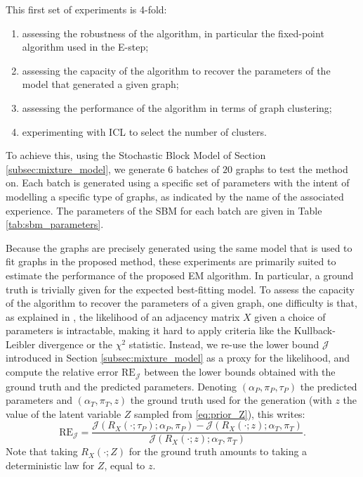 \documentclass[10pt]{article}
\newcommand{\J}{\mathcal{J}}
\begin{document}
This first set of experiments is 4-fold:
\begin{enumerate}
    \item assessing the robustness of the algorithm, in particular the fixed-point algorithm used in the E-step;
    \item assessing the capacity of the algorithm to recover the parameters of the model that generated a given graph;
    \item assessing the performance of the algorithm in terms of graph clustering;
    \item experimenting with ICL to select the number of clusters.
\end{enumerate}
To achieve this, using the Stochastic Block Model of Section \ref{subsec:mixture_model}, we generate 6 batches of $20$ graphs to test the method on. Each batch is generated using a specific set of parameters with the intent of modelling a specific type of graphs, as indicated by the name of the associated experience. The parameters of the SBM for each batch are given in Table \ref{tab:sbm_parameters}.

Because the graphs are precisely generated using the same model that is used to fit graphs in the proposed method, these experiments are primarily suited to estimate the performance of the proposed EM algorithm. In particular, a ground truth is trivially given for the expected best-fitting model. To assess the capacity of the algorithm to recover the parameters of a given graph, one difficulty is that, as explained in \cite{main_article}, the likelihood of an adjacency matrix $X$ given a choice of parameters is intractable, making it hard to apply criteria like the Kullback-Leibler divergence or the $\chi^2$ statistic. Instead, we re-use the lower bound $\mathcal{J}$ introduced in Section \ref{subsec:mixture_model} as a proxy for the likelihood, and compute the relative error $\mathrm{RE}_\J$ between the lower bounds obtained with the ground truth and the predicted parameters. Denoting $(\alpha_P, \pi_P, \tau_P)$ the predicted parameters and $(\alpha_T, \pi_T, z)$ the ground truth used for the generation (with $z$ the value of the latent variable $Z$ sampled from \eqref{eq:prior_Z}), this writes:
\begin{equation}
    \mathrm{RE}_\J = \frac{\J(R_X(\cdot; \tau_P); \alpha_P, \pi_P) - \J(R_X(\cdot; z); \alpha_T, \pi_T)}{\J(R_X(\cdot; z); \alpha_T, \pi_T)}.
\end{equation}
Note that taking $R_X(\cdot; Z)$ for the ground truth amounts to taking a deterministic law for $Z$, equal to $z$.
\end{document}
